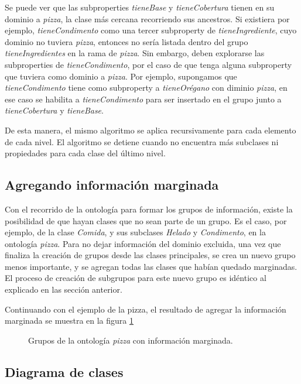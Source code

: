Se puede ver que las subproperties \emph{tieneBase} y \emph{tieneCobertura} tienen en su dominio a \emph{pizza}, la clase más cercana recorriendo sus ancestros. Si existiera por ejemplo, \emph{tieneCondimento} como una tercer subproperty de \emph{tieneIngrediente}, cuyo dominio no tuviera \emph{pizza}, entonces no sería listada dentro del grupo \emph{tieneIngredientes} en la rama de \emph{pizza}. Sin embargo, deben explorarse las subproperties de \emph{tieneCondimento}, por el caso de que tenga alguna subproperty que tuviera como dominio a \emph{pizza}. Por ejemplo, supongamos que \emph{tieneCondimento} tiene como subproperty a \emph{tieneOrégano} con diminio \emph{pizza}, en ese caso se habilita a \emph{tieneCondimento} para ser insertado en el grupo junto a  \emph{tieneCobertura} y \emph{tieneBase}.  

De esta manera, el mismo algoritmo se aplica recursivamente para cada elemento de cada nivel. El algoritmo se detiene cuando no encuentra más subclases ni propiedades para cada clase del último nivel.

\subsection{Agregando información marginada}
Con el recorrido de la ontología para formar los grupos de información, existe la posibilidad de que hayan clases que no sean parte de un grupo. Es el caso, por ejemplo, de la clase \emph{Comida}, y sus subclases \emph{Helado} y \emph{Condimento}, en la ontología \emph{pizza}. Para no dejar información del dominio excluida, una vez que finaliza la creación de grupos desde las clases principales, se crea un nuevo grupo menos importante, y se agregan todas las clases que habían quedado marginadas. El proceso de creación de subgrupos para este nuevo grupo es idéntico al explicado en las sección anterior.

Continuando con el ejemplo de la pizza, el resultado de agregar la  información marginada se muestra en la figura \ref{fig:macro_planning_pizza_marg}

\begin{figure}[H]
\caption{Grupos de la ontología \emph{pizza} con información marginada.}
\label{fig:macro_planning_pizza_marg}
\end{figure}

\subsection{Diagrama de clases}

